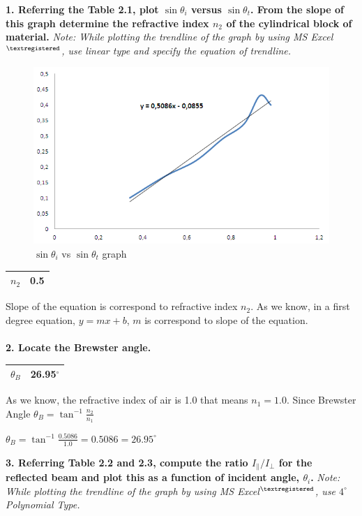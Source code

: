 \documentclass[a4paper,12pt]{report}
\begin{document}
\textbf{1. Referring the Table 2.1, plot $\sin\theta_{i}$ versus $\sin\theta_{t}$. From the slope of this graph determine the refractive index $n_{2}$ of the cylindrical block of material.} \textit{Note: While plotting the trendline of the graph by using MS Excel$^{\textregistered}$, use linear type and specify the equation of trendline.}
\begin{figure}[h!]
\centering
\includegraphics[width=1.0\linewidth, height=0.4\textheight]{g1}
\caption{$\sin\theta_{i}$ vs $\sin\theta_{t}$ graph}
\label{fig:g1}
\end{figure}
\begin{center}
	\begin{tabular}{|c||c|}
	\hline $n_{2}$ & 0.5 \\ 
	\hline 
\end{tabular} 
\end{center}
Slope of the equation is correspond to refractive index $n_{2}$. As we know, in a first degree equation, $y=mx+b$, $m$ is correspond to slope of the equation.\\\\
\textbf{2. Locate the Brewster angle.}
\begin{center}
	\begin{tabular}{|c||c|}
		\hline $\theta_{B}$ & 26.95$^{\circ}$ \\ 
		\hline 
	\end{tabular} 
\end{center}
As we know, the refractive index of air is 1.0 that means $n_{1}=1.0$. Since Brewster Angle $\theta_{B}=\tan^{-1}\frac{n_{2}}{n_{1}}$
\begin{center}
	$\theta_{B}=\tan^{-1}\frac{0.5086}{1.0}=0.5086=26.95^{\circ}$
\end{center}
\textbf{3. Referring Table 2.2 and 2.3, compute the ratio $I_{\parallel}/I_{\perp}$ for the reflected beam and plot this as a function of incident angle, $\theta_{i}$.} \textit{Note: While plotting the trendline of the graph by using MS Excel$^{\textregistered}$, use $4^{\circ}$ Polynomial Type.}\\\\
\end{document}
